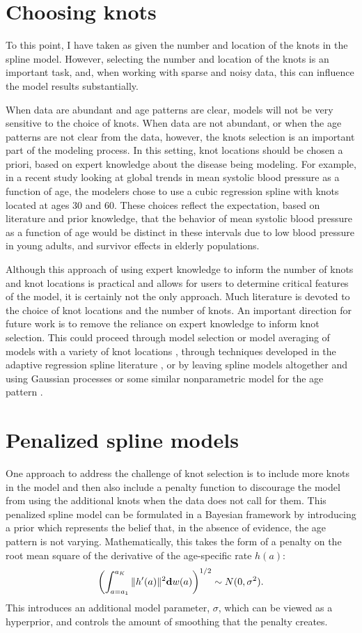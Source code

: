 \section{Choosing knots}

To this point, I have taken as given the number and location of the
knots in the spline model. However, selecting the number and location
of the knots is an important task, and, when working with sparse and
noisy data, this can influence the model results
substantially.

When data are abundant and age patterns are clear, models will not be
very sensitive to the choice of knots.  When data are not abundant, or
when the age patterns are not clear from the data, however, the knots
selection is an important part of the modeling process.  In this
setting, knot locations should be chosen a priori, based on expert
knowledge about the disease being modeling. For example, in a recent
study looking at global trends in mean systolic blood pressure as a
function of age, the modelers chose to use a cubic regression spline
with knots located at ages 30 and 60.\cite{danaei_national_2011} These
choices reflect the expectation, based on literature and prior
knowledge, that the behavior of mean systolic blood pressure as a
function of age would be distinct in these intervals due to low blood
pressure in young adults, and survivor effects in elderly populations.

Although this approach of using expert knowledge to inform the number
of knots and knot locations is practical and allows for users to
determine critical features of the model, it is certainly not the only
approach. Much literature is devoted to the choice of knot locations
and the number of knots.
An important direction for future work is to remove the reliance on
expert knowledge to inform knot selection.  This could proceed
through model selection or model averaging of models with a variety of
knot locations \cite{raftery_bayesian_1997}, through
techniques developed in the adaptive regression spline literature
\cite{friedman_multivariate_1991}, or by leaving spline models altogether and using Gaussian
processes or some similar nonparametric model for the age pattern
\cite{rasmussen_gaussian_2006,diggle_model-based_2010}.

\section{Penalized spline models}
One approach to address the challenge of knot selection is to include
more knots in the model and then also include a penalty function to
discourage the model from using the additional knots when the data
does not call for them.  This penalized spline model can be formulated in a
Bayesian framework by introducing a prior which represents the belief that, in
the absence of evidence, the age pattern is not varying.
Mathematically, this takes the form of a penalty on the root mean
square of the derivative of the age-specific rate $h(a)$:
\[
\left(\int _{a=a_1} ^{a_K} \| h'(a) \|^2 \mathbf{d} w(a)\right)^{1/2} \sim N(0, \sigma^2).
\]
This introduces an additional model parameter, $\sigma$, which can be
viewed as a hyperprior, and controls the amount of smoothing that the
penalty creates.

